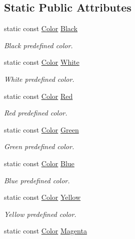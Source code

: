 \subsection*{Static Public Attributes}
\begin{DoxyCompactItemize}
\item 
static const \hyperlink{classsf_1_1_color}{Color} \hyperlink{classsf_1_1_color_a77c688197b981338f0b19dc58bd2facd}{Black}
\begin{DoxyCompactList}\small\item\em Black predefined color. \end{DoxyCompactList}\item 
static const \hyperlink{classsf_1_1_color}{Color} \hyperlink{classsf_1_1_color_a4fd874712178d9e206f53226002aa4ca}{White}
\begin{DoxyCompactList}\small\item\em White predefined color. \end{DoxyCompactList}\item 
static const \hyperlink{classsf_1_1_color}{Color} \hyperlink{classsf_1_1_color_a127dbf55db9c07d0fa8f4bfcbb97594a}{Red}
\begin{DoxyCompactList}\small\item\em Red predefined color. \end{DoxyCompactList}\item 
static const \hyperlink{classsf_1_1_color}{Color} \hyperlink{classsf_1_1_color_a95629b30de8c6856aa7d3afed12eb865}{Green}
\begin{DoxyCompactList}\small\item\em Green predefined color. \end{DoxyCompactList}\item 
static const \hyperlink{classsf_1_1_color}{Color} \hyperlink{classsf_1_1_color_ab03770d4817426b2614cfc33cf0e245c}{Blue}
\begin{DoxyCompactList}\small\item\em Blue predefined color. \end{DoxyCompactList}\item 
static const \hyperlink{classsf_1_1_color}{Color} \hyperlink{classsf_1_1_color_af8896b5f56650935f5b9d72d528802c7}{Yellow}
\begin{DoxyCompactList}\small\item\em Yellow predefined color. \end{DoxyCompactList}\item 
static const \hyperlink{classsf_1_1_color}{Color} \hyperlink{classsf_1_1_color_a6fe70d90b65b2163dd066a84ac00426c}{Magenta}

\end{DoxyCompactItemize}
